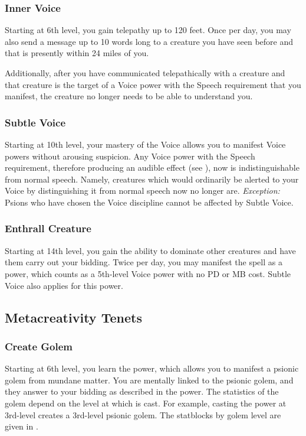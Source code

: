 \subsubsection{Inner Voice}
Starting at 6th level,
you gain telepathy up to 120 feet.
Once per day,
you may also send a message up to 10 words long
to a creature you have seen before and that is
presently within 24 miles of you.

Additionally,
after you have communicated telepathically with a creature
and that creature is the target of a Voice power with the Speech
requirement that you manifest,
the creature no longer needs to be able to understand you.

\subsubsection{Subtle Voice}
Starting at 10th level,
your mastery of the Voice allows you to manifest Voice
powers without arousing suspicion.
Any Voice power with the Speech requirement,
therefore producing an audible effect
(see ),
now is indistinguishable from normal speech.
Namely,
creatures which would ordinarily be alerted
to your Voice by distinguishing it from normal speech
now no longer are.
\emph{Exception:} Psions who have chosen the Voice discipline
cannot be affected by Subtle Voice.

\subsubsection{Enthrall Creature}
Starting at 14th level,
you gain the ability to dominate other creatures and have them
carry out your bidding.
Twice per day,
you may manifest the  spell as a power,
which counts as a 5th-level Voice power with no PD or MB cost.
Subtle Voice also applies for this power.

\subsection{Metacreativity Tenets}
\label{sub:metacreativity_tenets}
\subsubsection{Create Golem}
\label{subs:menu_a}
Starting at 6th level,
you learn the  power,
which allows you to manifest a psionic golem
from mundane matter.
You are mentally linked to the psionic golem,
and they answer to your bidding as described in the power.
The statistics of the golem depend on the level
at which  is cast.
For example,
casting the power at 3rd-level creates a 3rd-level psionic golem.
The statblocks by golem level are given in .

